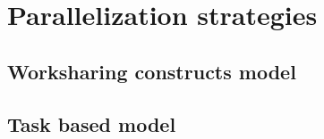 \section{Parallelization strategies}
\subsection{Worksharing constructs model}

\subsection{Task based model}
